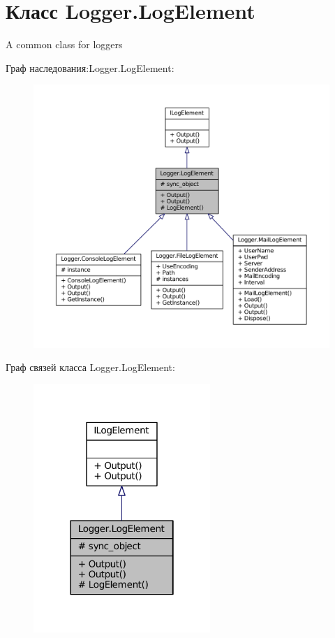 \hypertarget{class_logger_1_1_log_element}{}\section{Класс Logger.\+Log\+Element}
\label{class_logger_1_1_log_element}


A common class for loggers  




Граф наследования\+:Logger.\+Log\+Element\+:
\nopagebreak
\begin{figure}[H]
\begin{center}
\leavevmode
\includegraphics[width=350pt]{class_logger_1_1_log_element__inherit__graph}
\end{center}
\end{figure}


Граф связей класса Logger.\+Log\+Element\+:
\nopagebreak
\begin{figure}[H]
\begin{center}
\leavevmode
\includegraphics[width=190pt]{class_logger_1_1_log_element__coll__graph}
\end{center}
\end{figure}

